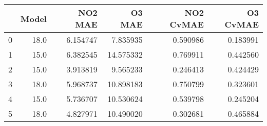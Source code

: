 \begin{tabular}{lrrrrr}
\toprule
{} &  Model &   NO2 MAE &     O3 MAE &  NO2 CvMAE &  O3 CvMAE \\
\midrule
0 &   18.0 &  6.154747 &   7.835935 &   0.590986 &  0.183991 \\
1 &   15.0 &  6.382545 &  14.575332 &   0.769911 &  0.442560 \\
2 &   15.0 &  3.913819 &   9.565233 &   0.246413 &  0.424429 \\
3 &   18.0 &  5.968737 &  10.898183 &   0.750799 &  0.323601 \\
4 &   15.0 &  5.736707 &  10.530624 &   0.539798 &  0.245204 \\
5 &   18.0 &  4.827971 &  10.490020 &   0.302681 &  0.465884 \\
\bottomrule
\end{tabular}
